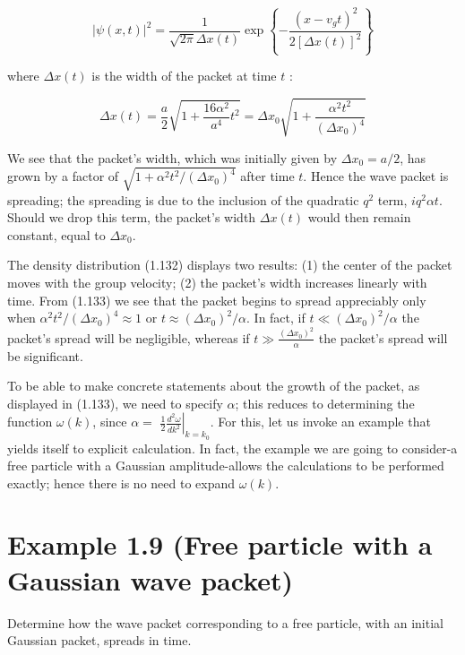 \documentclass[10pt]{article}
\begin{document}
\begin{equation*}
|\psi(x, t)|^{2}=\frac{1}{\sqrt{2 \pi} \Delta x(t)} \exp \left\{-\frac{\left(x-v_{g} t\right)^{2}}{2[\Delta x(t)]^{2}}\right\} \tag{1.132}
\end{equation*}


where $\Delta x(t)$ is the width of the packet at time $t$ :


\begin{equation*}
\Delta x(t)=\frac{a}{2} \sqrt{1+\frac{16 \alpha^{2}}{a^{4}} t^{2}}=\Delta x_{0} \sqrt{1+\frac{\alpha^{2} t^{2}}{\left(\Delta x_{0}\right)^{4}}} \tag{1.133}
\end{equation*}


We see that the packet's width, which was initially given by $\Delta x_{0}=a / 2$, has grown by a factor of $\sqrt{1+\alpha^{2} t^{2} /\left(\Delta x_{0}\right)^{4}}$ after time $t$. Hence the wave packet is spreading; the spreading is due to the inclusion of the quadratic $q^{2}$ term, $i q^{2} \alpha t$. Should we drop this term, the packet's width $\Delta x(t)$ would then remain constant, equal to $\Delta x_{0}$.

The density distribution (1.132) displays two results: (1) the center of the packet moves with the group velocity; (2) the packet's width increases linearly with time. From (1.133) we see that the packet begins to spread appreciably only when $\alpha^{2} t^{2} /\left(\Delta x_{0}\right)^{4} \approx 1$ or $t \approx\left(\Delta x_{0}\right)^{2} / \alpha$. In fact, if $t \ll\left(\Delta x_{0}\right)^{2} / \alpha$ the packet's spread will be negligible, whereas if $t \gg \frac{\left(\Delta x_{0}\right)^{2}}{\alpha}$ the packet's spread will be significant.

To be able to make concrete statements about the growth of the packet, as displayed in (1.133), we need to specify $\alpha$; this reduces to determining the function $\omega(k)$, since $\alpha=$ $\left.\frac{1}{2} \frac{d^{2} \omega}{d k^{2}}\right|_{k=k_{0}}$. For this, let us invoke an example that yields itself to explicit calculation. In fact, the example we are going to consider-a free particle with a Gaussian amplitude-allows the calculations to be performed exactly; hence there is no need to expand $\omega(k)$.

\section*{Example 1.9 (Free particle with a Gaussian wave packet)}
Determine how the wave packet corresponding to a free particle, with an initial Gaussian packet, spreads in time.
\end{document}
